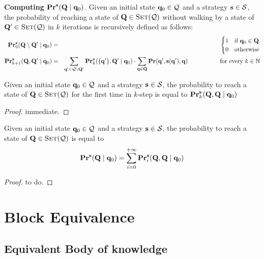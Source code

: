 \medskip
\noindent
\textbf{Computing $\mathbf{Pr}^{\mathbf{s}}(\mathbf{Q} \mid \mathbf{q}_0)$}. Given an initial state $\mathbf{q}_0 \in \mathcal{Q}$ and a strategy $\mathbf{s} \in \mathcal{S}$, the probability of reaching a state of $\mathbf{Q} \in \text{\sc Set}(\mathcal{Q})$  without walking by a state of $\mathbf{Q}' \in \text{\sc Set}(\mathcal{Q})$ in $k$ iterations is recursively defined as follows:
\begin{eqnarray*}
	\mathbf{Pr}_0^{\mathbf{s}}(\mathbf{Q} \setminus \mathbf{Q}' \mid \mathbf{q}_0) & = &
	\begin{cases}
		1 & \text{if } \mathbf{q}_0 \in \mathbf{Q}\\
		0 & \text{otherwise}
	\end{cases}\\
	\mathbf{Pr}_{k+1}^{\mathbf{s}}(\mathbf{Q},\mathbf{Q}' \mid \mathbf{q}_0) & = & \sum_{\mathbf{q}' \in \mathcal{Q} \setminus \mathbf{Q}'} \mathbf{Pr}_k^{\mathbf{s}}(\{\mathbf{q}'\},\mathbf{Q}'\mid \mathbf{q}_0) \cdot \sum_{\mathbf{q} \in \mathbf{Q}} \mathbf{Pr}(\mathbf{q}', \mathbf{s}(\mathbf{q}'), \mathbf{q}) \quad \quad \quad  \quad \quad \text{ for every } k \in \mathbb{N}
\end{eqnarray*}

\begin{mylem}
	Given an initial state $\mathbf{q}_0 \in \mathcal{Q}$ and a strategy $\mathbf{s} \in \mathcal{S}$, the probability to reach a state of $\mathbf{Q} \in \text{\sc Set}(\mathcal{Q})$ for the first time in $k$-step is equal to $\mathbf{Pr}^{\mathbf{s}}_k(\mathbf{Q},\mathbf{Q} \mid \mathbf{q}_0)$
\end{mylem}

\begin{proof}
	immediate.
\end{proof}

\begin{myprop}
	Given an initial state $\mathbf{q}_0 \in \mathcal{Q}$ and a strategy $\mathbf{s} \in \mathcal{S}$, the probability to reach a state of $\mathbf{Q} \in \text{\sc Set}(\mathcal{Q})$  is equal to $$\mathbf{Pr}^{\mathbf{s}}(\mathbf{Q} \mid \mathbf{q}_0) = \sum_{i=0}^{+\infty}\mathbf{Pr}^{\mathbf{s}}_i(\mathbf{Q},\mathbf{Q} \mid \mathbf{q}_0)$$
\end{myprop}

\begin{proof}
	to do.
\end{proof}


\section{Block Equivalence}

\subsection{Equivalent Body of knowledge}

